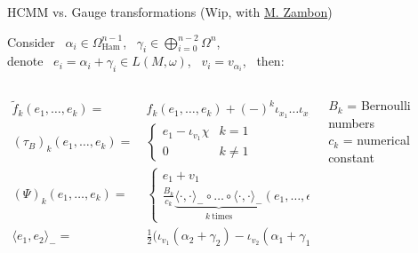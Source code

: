 \documentclass[final,a0paper,20pt,
						pdftex,
            pdfauthor={Antonio Michele Miti},
            pdftitle={Homotopy title},
            pdfsubject={Poster for the conference Super19 in Luxembourg},
            pdfkeywords={Some Keywords},
            pdfproducer={Latex with hyperref, or other system},
            pdfcreator={pdflatex, or other tool}
            ]{beamer}
\newcommand{\pinned}[1]{
    \faThumbTack 
    \hfill
    #1
    \hfill \faThumbTack
    \\
    }
\begin{document}
\begin{frame}[t]
\begin{columns}[t]
\begin{column}{\onecolwid}
\begin{block}{\pinned{HCMM vs. Gauge transformations
		{\small(Wip, with \href{https://perswww.kuleuven.be/~u0096206/}{M. Zambon})
		}}}
		\begin{propblock}
			\centering
			\parbox{0.96\linewidth}{%
				Consider ~$\alpha_i \in \Omega_{\text{Ham}}^{n-1}$,
				~$\gamma_i \in \bigoplus_{i=0}^{n-2}\Omega^n$,
				\\
				denote ~$e_i = \alpha_i + \gamma_i \in L(M,\omega)$, 
				~$v_i = v_{\alpha_i}$,  ~then:
			}
			\begin{columns}[T]
				\begin{column}{.8\linewidth}
					\begin{displaymath}
						\begin{split}
							\tilde{f}_k(e_1,\dots,e_k) =&~
							f_k(e_1,\dots,e_k)  + (-)^k \iota_{x_1}\dots\iota_{x_1} \chi
							\\
							(\tau_B)_k (e_1,\dots,e_k) =&~
							\begin{cases}
								e_1 - \iota_{v_1} \chi & k=1 \\
								0	& k \neq 1
							\end{cases}
							\\
							(\Psi)_k (e_1,\dots,e_k) =&~
							\begin{cases}
								e_1 + v_1 & k=1 \\
								\frac{B_k}{c_k} 
							\underbrace{\langle\cdot,\cdot\rangle_-\circ\dots\circ\langle\cdot,\cdot\rangle_-}_{k ~\text{times}}(e_1,\dots,e_k)	& k \neq 1
							\end{cases}
							\\
							\langle e_1,e_2 \rangle_- =&~
							\frac{1}{2}\big(\iota_{v_1}(\alpha_2+\gamma_2)
							- \iota_{v_2}(\alpha_1+\gamma_1)\big)							
						\end{split}
					\end{displaymath}
				\end{column}
				\begin{column}{.2\linewidth}
					\vspace{5em}
					\small
					$B_k$ = Bernoulli numbers \\
					$c_k$ = numerical constant
				\end{column}			
			\end{columns}		
		\end{propblock}
	\end{block}
\end{column} %
\begin{column}{\sepwidexternal}\end{column} %


\end{columns} %
\end{frame} %
\end{document}
